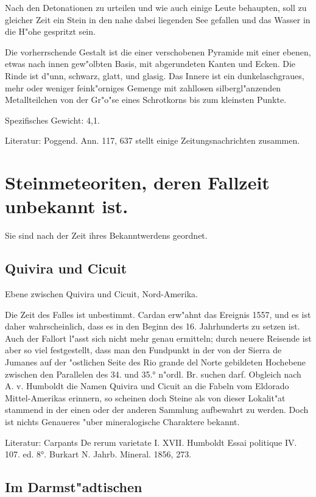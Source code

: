 \documentclass[a4paper, 11pt, oneside]{article}
\begin{document}
Nach den Detonationen zu urteilen und wie auch einige Leute behaupten, soll zu gleicher Zeit ein Stein in den nahe dabei liegenden See gefallen und das Wasser in die H"ohe gespritzt sein.

Die vorherrschende Gestalt ist die einer verschobenen Pyramide mit einer ebenen, etwas nach innen gew"olbten Basis, mit abgerundeten Kanten und Ecken. Die Rinde ist d"unn, schwarz, glatt, und glasig. Das Innere ist ein dunkelaschgraues, mehr oder weniger feink"orniges Gemenge mit zahllosen silbergl"anzenden Metallteilchen von der Gr"o"se eines Schrotkorns bis zum kleinsten Punkte.

Spezifisches Gewicht: 4,1.

Literatur: Poggend. Ann. 117, 637 stellt einige Zeitungsnachrichten zusammen.

\section{Steinmeteoriten, deren Fallzeit unbekannt ist.}

Sie sind nach der Zeit ihres Bekanntwerdens geordnet.

\subsection{Quivira und Cicuit}

Ebene zwischen Quivira und Cicuit, Nord-Amerika.

Die Zeit des Falles ist unbestimmt. Cardan erw"ahnt das Ereignis 1557, und es ist daher wahrscheinlich, dass es in den Beginn des 16. Jahrhunderts zu setzen ist. Auch der Fallort l"asst sich nicht mehr genau ermitteln; durch neuere Reisende ist aber so viel festgestellt, dass man den Fundpunkt in der von der Sierra de Jumanes auf der "ostlichen Seite des Rio grande del Norte gebildeten Hochebene zwischen den Parallelen des 34. und 35.° n"ordl. Br. suchen darf. Obgleich nach A. v. Humboldt die Namen Quivira und Cicuit an die Fabeln vom Eldorado Mittel-Amerikas erinnern, so scheinen doch Steine als von dieser Lokalit"at stammend in der einen oder der anderen Sammlung aufbewahrt zu werden. Doch ist nichts Genaueres "uber mineralogische Charaktere bekannt.

Literatur: Carpants De rerum varietate I. XVII. Humboldt Essai politique IV. 107. ed. 8°. Burkart N. Jahrb. Mineral. 1856, 273.

\subsection{Im Darmst"adtischen}
\end{document}
